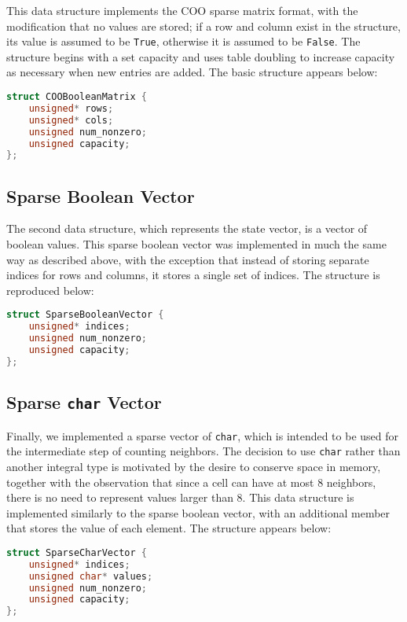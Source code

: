 \documentclass[12pt]{article}
\begin{document}
This data structure implements the COO sparse matrix format, with the modification that no values are stored; if a row and column exist in the structure, its value is assumed to be \texttt{True}, otherwise it is assumed to be \texttt{False}. The structure begins with a set capacity and uses table doubling \cite{mit} to increase capacity as necessary when new entries are added. The basic structure appears below: \\

\begin{lstlisting}[language=C]
struct COOBooleanMatrix {
    unsigned* rows;
    unsigned* cols;
    unsigned num_nonzero;
    unsigned capacity;
};
\end{lstlisting}

\subsection{Sparse Boolean Vector}

The second data structure, which represents the state vector, is a vector of boolean values. This sparse boolean vector was implemented in much the same way as described above, with the exception that instead of storing separate indices for rows and columns, it stores a single set of indices. The structure is reproduced below: \\

\begin{lstlisting}[language=C]
struct SparseBooleanVector {
    unsigned* indices;
    unsigned num_nonzero;
    unsigned capacity;
};
\end{lstlisting}

\subsection{Sparse \texttt{char} Vector}

Finally, we implemented a sparse vector of \texttt{char}, which is intended to be used for the intermediate step of counting neighbors. The decision to use \texttt{char} rather than another integral type is motivated by the desire to conserve space in memory, together with the observation that since a cell can have at most 8 neighbors, there is no need to represent values larger than 8. This data structure is implemented similarly to the sparse boolean vector, with an additional member that stores the value of each element. The structure appears below: \\

\begin{lstlisting}[language=C]
struct SparseCharVector {
    unsigned* indices;
    unsigned char* values;
    unsigned num_nonzero;
    unsigned capacity;
};
\end{lstlisting}
\end{document}
